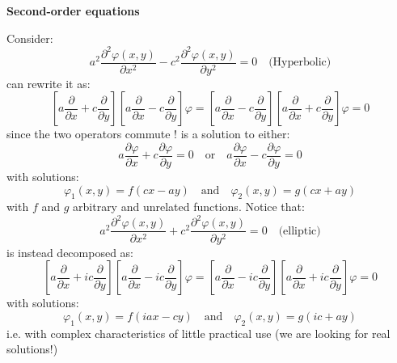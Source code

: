 \documentclass{article}
\newcommand{\vp}{\varphi}
\begin{document}
\noindent
\textbf{Second-order equations}

\noindent
Consider:
\begin{equation}
    a^2 \frac{\partial^2 \varphi(x, y)}{\partial x^2}
- c^2 \frac{\partial^2 \varphi(x, y)}{\partial y^2}
= 0 \quad \text{(Hyperbolic)}
\end{equation}
can rewrite it as:
\begin{equation}
    \left[ a \frac{\partial}{\partial x} + c \frac{\partial}{\partial y} \right]
\left[ a \frac{\partial}{\partial x} - c \frac{\partial}{\partial y} \right] \varphi
=
\left[ a \frac{\partial}{\partial x} - c \frac{\partial}{\partial y} \right]
\left[ a \frac{\partial}{\partial x} + c \frac{\partial}{\partial y} \right] \varphi
= 0
\end{equation}
since the two operators commute ! is a solution to either:
\begin{equation}
    a \frac{\partial \vp}{\partial x} + c \frac{\partial \vp}{\partial y} = 0 \quad \text{or} \quad a \frac{\partial \vp}{\partial x} - c \frac{\partial \vp}{\partial y} = 0
\end{equation}
with solutions:
\begin{equation}
    \vp_1 (x,y) = f(cx-ay) \quad \text{and} \quad \vp_2 (x,y) =g(cx+ay)
\end{equation}
with $f$ and $g$ arbitrary and unrelated functions. Notice that:
\begin{equation}
    a^2 \frac{\partial^2 \varphi(x, y)}{\partial x^2}
+ c^2 \frac{\partial^2 \varphi(x, y)}{\partial y^2}
= 0 \quad \text{(elliptic)}
\end{equation}
is instead decomposed as:
\begin{equation}
    \left[ a \frac{\partial}{\partial x} + i c \frac{\partial}{\partial y} \right]
\left[ a \frac{\partial}{\partial x} - i c \frac{\partial}{\partial y} \right] \varphi
=
\left[ a \frac{\partial}{\partial x} - i c \frac{\partial}{\partial y} \right]
\left[ a \frac{\partial}{\partial x} + i c \frac{\partial}{\partial y} \right] \varphi
= 0
\end{equation}
with solutions:
\begin{equation}
    \varphi_1(x, y) = f(i a x - c y)
\quad \text{and} \quad 
\varphi_2(x, y) = g(i c + a y)
\end{equation}
i.e. with complex characteristics of little practical use (we are looking for real solutions!)
\end{document}
